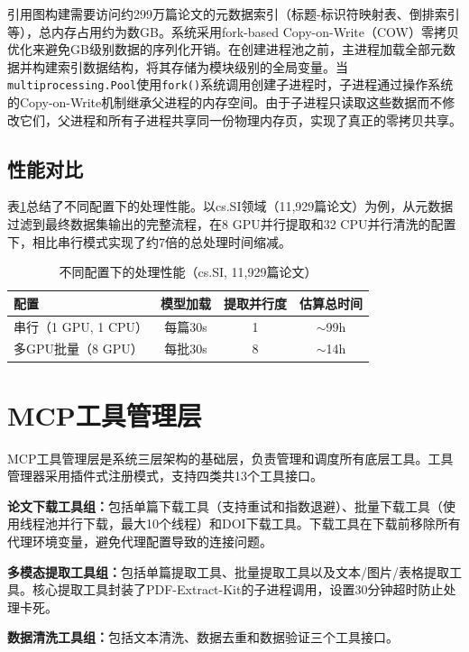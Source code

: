 引用图构建需要访问约299万篇论文的元数据索引（标题-标识符映射表、倒排索引等），总内存占用约为数GB。系统采用fork-based Copy-on-Write（COW）零拷贝优化来避免GB级别数据的序列化开销。在创建进程池之前，主进程加载全部元数据并构建索引数据结构，将其存储为模块级别的全局变量。当\texttt{multiprocessing.Pool}使用\texttt{fork()}系统调用创建子进程时，子进程通过操作系统的Copy-on-Write机制继承父进程的内存空间。由于子进程只读取这些数据而不修改它们，父进程和所有子进程共享同一份物理内存页，实现了真正的零拷贝共享。

\subsection{性能对比}

表\ref{tab:performance}总结了不同配置下的处理性能。以cs.SI领域（11,929篇论文）为例，从元数据过滤到最终数据集输出的完整流程，在8 GPU并行提取和32 CPU并行清洗的配置下，相比串行模式实现了约7倍的总处理时间缩减。

\begin{table}[htbp]
  \centering
  \caption{不同配置下的处理性能（cs.SI, 11,929篇论文）}
  \label{tab:performance}
  \begin{tabular}{lccc}
    \toprule
    配置 & 模型加载 & 提取并行度 & 估算总时间 \\
    \midrule
    串行（1 GPU, 1 CPU） & 每篇30s & 1 & $\sim$99h \\
    多GPU批量（8 GPU） & 每批30s & 8 & $\sim$14h \\
    \bottomrule
  \end{tabular}
\end{table}

\section{MCP工具管理层}

MCP工具管理层是系统三层架构的基础层，负责管理和调度所有底层工具。工具管理器采用插件式注册模式，支持四类共13个工具接口。

\textbf{论文下载工具组：}包括单篇下载工具（支持重试和指数退避）、批量下载工具（使用线程池并行下载，最大10个线程）和DOI下载工具。下载工具在下载前移除所有代理环境变量，避免代理配置导致的连接问题。

\textbf{多模态提取工具组：}包括单篇提取工具、批量提取工具以及文本/图片/表格提取工具。核心提取工具封装了PDF-Extract-Kit的子进程调用，设置30分钟超时防止处理卡死。

\textbf{数据清洗工具组：}包括文本清洗、数据去重和数据验证三个工具接口。

